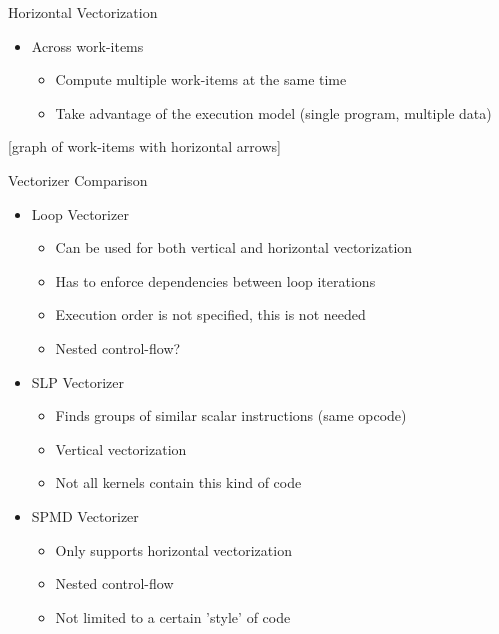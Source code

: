 \begin{frame}{Horizontal Vectorization}

\begin{itemize}
    \item Across work-items
    \begin{itemize}
        \item Compute multiple work-items at the same time
        \item Take advantage of the execution model (single program, multiple data)
    \end{itemize}
\end{itemize}

[graph of work-items with horizontal arrows]

\end{frame}


\begin{frame}{Vectorizer Comparison}

\begin{itemize}
    \item Loop Vectorizer
    \begin{itemize}
        \item Can be used for both vertical and horizontal vectorization
        \item Has to enforce dependencies between loop iterations
        \item Execution order is not specified, this is not needed
        \item Nested control-flow?
    \end{itemize}

    \item SLP Vectorizer
    \begin{itemize}
        \item Finds groups of similar scalar instructions (same opcode)
        \item Vertical vectorization
        \item Not all kernels contain this kind of code
    \end{itemize}

    \item SPMD Vectorizer
    \begin{itemize}
        \item Only supports horizontal vectorization
        \item Nested control-flow
        \item Not limited to a certain 'style' of code
    \end{itemize}
\end{itemize}

\end{frame}

